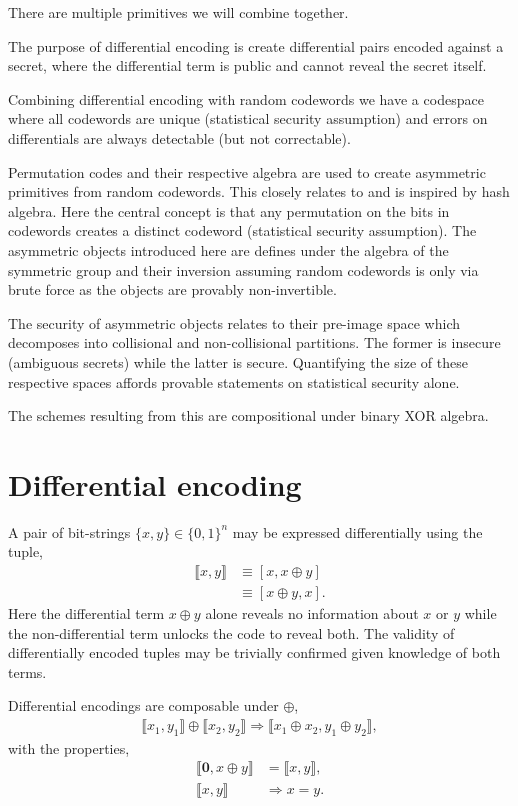 \documentclass[twocolumn, aps, amsmath, amssymb, nofootinbib, superscriptaddress, longbibliography, doublefloatfix, table-of-contents, eqsecnum, rmp]{revtex4-2}
\def\zerovec{\mathbf{0}}
\def\diff#1#2{\llbracket #1,#2\rrbracket}
\begin{document}
There are multiple primitives we will combine together.

The purpose of differential encoding is create differential pairs encoded against a secret, where the differential term is public and cannot reveal the secret itself.

Combining differential encoding with random codewords we have a codespace where all codewords are unique (statistical security assumption) and errors on differentials are always detectable (but not correctable).

Permutation codes and their respective algebra are used to create asymmetric primitives from random codewords. This closely relates to and is inspired by hash algebra. Here the central concept is that any permutation on the bits in codewords creates a distinct codeword (statistical security assumption). The asymmetric objects introduced here are defines under the algebra of the symmetric group and their inversion assuming random codewords is only via brute force as the objects are provably non-invertible.

The security of asymmetric objects relates to their pre-image space which decomposes into collisional and non-collisional partitions. The former is insecure (ambiguous secrets) while the latter is secure. Quantifying the size of these respective spaces affords provable statements on statistical security alone.

The schemes resulting from this are compositional under binary XOR algebra.

\section{Differential encoding}

A pair of bit-strings $\{x,y\}\in\{0,1\}^n$ may be expressed differentially using the tuple,
\begin{align}
	\diff{x}{y} &\equiv [x,x\oplus y] \nonumber\\
	&\equiv [x\oplus y,x].
\end{align}
Here the differential term $x\oplus y$ alone reveals no information about $x$ or $y$ while the non-differential term unlocks the code to reveal both. The validity of differentially encoded tuples may be trivially confirmed given knowledge of both terms.

Differential encodings are composable under $\oplus$,
\begin{align}
	\diff{x_1}{y_1} \oplus \diff{x_2}{y_2} \Rightarrow \diff{x_1\oplus x_2}{y_1 \oplus y_2},
\end{align}
with the properties,
\begin{align}
	\diff{\zerovec}{x\oplus y} &= \diff{x}{y}, \nonumber\\
	\diff{x}{y} &\Rightarrow x=y.
\end{align}
\end{document}
